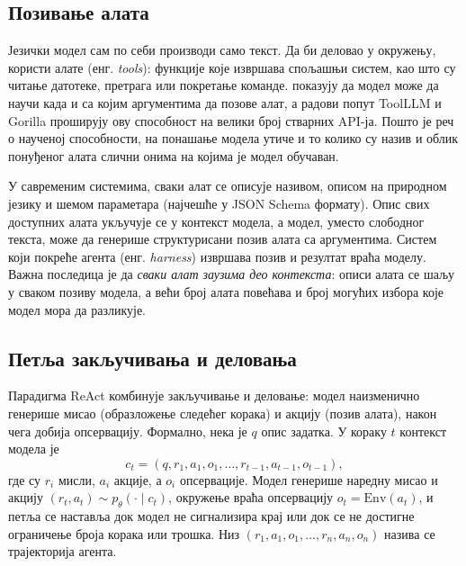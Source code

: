\documentclass[12pt,a4paper]{report}
\begin{document}
	\subsection{Позивање алата}

	Језички модел сам по себи производи само текст. Да би деловао у окружењу,
	користи алате (енг. \textit{tools}): функције које извршава спољашњи
	систем, као што су читање датотеке, претрага или покретање команде.
	\textcite{schick2023toolformer} показују да модел може да научи када и са
	којим аргументима да позове алат, а радови попут ToolLLM
	\parencite{qin2023toolllm} и Gorilla \parencite{patil2023gorilla}
	проширују ову способност на велики број стварних API-ја. Пошто је реч о
	наученој способности, на понашање модела утиче и то колико су назив и облик
	понуђеног алата слични онима на којима је модел обучаван.

	У савременим системима, сваки алат се описује називом, описом на природном
	језику и шемом параметара (најчешће у JSON Schema формату). Опис свих
	доступних алата укључује се у контекст модела, а модел, уместо слободног
	текста, може да генерише структурисани позив алата са аргументима. Систем
	који покреће агента (енг. \textit{harness}) извршава позив и резултат враћа
	моделу. Важна последица је да \emph{сваки алат заузима део контекста}:
	описи алата се шаљу у сваком позиву модела, а већи број алата повећава и
	број могућих избора које модел мора да разликује.

	\subsection{Петља закључивања и деловања}

	Парадигма ReAct \parencite{yao2023react} комбинује закључивање и деловање:
	модел наизменично генерише мисао (образложење следећег корака) и акцију
	(позив алата), након чега добија опсервацију. Формално, нека је $q$ опис
	задатка. У кораку $t$ контекст модела је
	\begin{equation}
		c_t = (q, r_1, a_1, o_1, \dots, r_{t-1}, a_{t-1}, o_{t-1}),
	\end{equation}
	где су $r_i$ мисли, $a_i$ акције, а $o_i$ опсервације. Модел генерише
	наредну мисао и акцију $(r_t, a_t) \sim p_\theta(\cdot \mid c_t)$, окружење
	враћа опсервацију $o_t = \mathrm{Env}(a_t)$, и петља се наставља док модел
	не сигнализира крај или док се не достигне ограничење броја корака или
	трошка. Низ $(r_1, a_1, o_1, \dots, r_n, a_n, o_n)$ назива се трајекторија
	агента.
\end{document}
